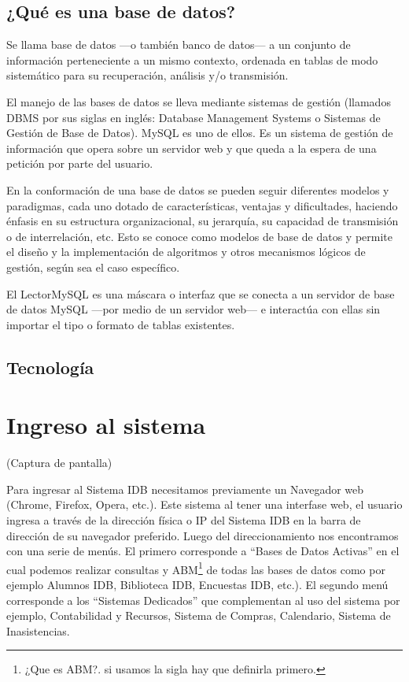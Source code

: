 \documentclass[a4paper,10pt]{article}
\begin{document}
\subsection{¿Qué es una base de datos?}
Se llama base de datos ---o también banco de datos--- a un conjunto de información 
perteneciente a un mismo contexto, ordenada en tablas de modo sistemático para su 
recuperación, análisis y/o transmisión.

El manejo de las bases de datos se lleva mediante sistemas de gestión (llamados 
DBMS por sus siglas en inglés: Database Management Systems o Sistemas de Gestión 
de Base de Datos). MySQL es uno de ellos. Es un sistema de gestión de información que opera 
sobre un servidor web y que queda a la espera de una petición por parte del usuario.

En la conformación de una base de datos se pueden seguir diferentes modelos y 
paradigmas, cada uno dotado de características, ventajas y dificultades, 
haciendo énfasis en su estructura organizacional, su jerarquía, su capacidad de 
transmisión o de interrelación, etc. Esto se conoce como modelos de base de 
datos y permite el diseño y la implementación de algoritmos y otros mecanismos 
lógicos de gestión, según sea el caso específico.

El LectorMySQL es una máscara o interfaz que se conecta a un servidor de base de datos MySQL ---por medio de un servidor web---
 e interactúa con ellas sin importar el tipo o formato de tablas existentes.

\subsection{Tecnología}

\section{Ingreso al sistema}

(Captura de pantalla)

Para ingresar al Sistema IDB necesitamos previamente un Navegador web (Chrome, Firefox, Opera, etc.). Este sistema al tener una interfase web, el usuario ingresa a través de la dirección física o IP del Sistema IDB en la barra de dirección de su navegador preferido. Luego del direccionamiento nos encontramos con una serie de menús. El primero corresponde a “Bases de Datos Activas” en el cual podemos realizar consultas y ABM\footnote{¿Que es ABM?. si usamos la sigla hay que definirla primero.} de todas las bases de datos como por ejemplo Alumnos IDB, Biblioteca IDB, Encuestas IDB, etc.). El segundo menú corresponde a los “Sistemas Dedicados” que complementan al uso del sistema por ejemplo, Contabilidad y Recursos, Sistema de Compras, Calendario, Sistema de Inasistencias.
\end{document}
